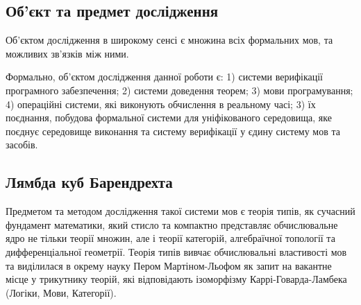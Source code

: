 \subsection{Об'єкт та предмет дослідження}
Об'єктом дослідження в широкому сенсі є множина
всіх формальних мов, та можливих зв'язків між ними.

Формально, об'єктом дослідження данної роботи є:
1) системи верифікації програмного забезпечення;
2) системи доведення теорем;
3) мови програмування;
4) операційні системи, які виконують обчислення в реальному часі;
3) їх поєднання, побудова формальної системи для
уніфікованого середовища, яке поєднує середовище
виконання та систему верифікації у єдину систему мов та засобів.

\subsection*{Лямбда куб Барендрехта}

\begin{center}
\end{center}

Предметом та методом дослідження такої системи мов є теорія типів,
як сучасний фундамент математики,
який стисло та компактно представляє обчислювальне ядро не тільки теорії множин,
але і теорії категорій, алгебраїчної топології та дифференціальної геометрії.
Теорія типів вивчає обчислювальні властивості мов та виділилася
в окрему науку Пером Мартіном-Льофом як запит на вакантне місце у
трикутнику теорій, які відповідають ізоморфізму
Каррі-Говарда-Ламбека (Логіки, Мови, Категорії).

